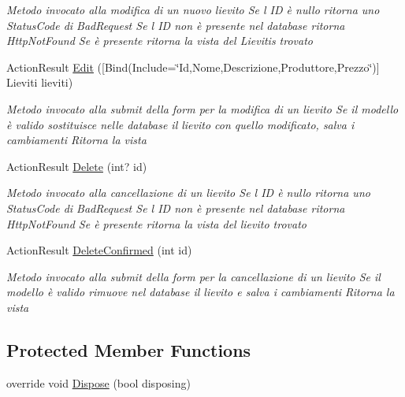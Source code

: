 \begin{DoxyCompactItemize}
\begin{DoxyCompactList}\small\item\em Metodo invocato alla modifica di un nuovo lievito Se l\textquotesingle{} ID è nullo ritorna uno Status\+Code di Bad\+Request Se l\textquotesingle{} ID non è presente nel database ritorna Http\+Not\+Found Se è presente ritorna la vista del Lievitis trovato \end{DoxyCompactList}\item 
Action\+Result \mbox{\hyperlink{class_brew_day2_1_1_controllers_1_1_lievitis_controller_a6be4c8d40b258ae3adc9d1f2c4e74f5e}{Edit}} (\mbox{[}Bind(Include=\char`\"{}Id,Nome,Descrizione,Produttore,Prezzo\char`\"{})\mbox{]} Lieviti lieviti)
\begin{DoxyCompactList}\small\item\em Metodo invocato alla submit della form per la modifica di un lievito Se il modello è valido sostituisce nelle database il lievito con quello modificato, salva i cambiamenti Ritorna la vista \end{DoxyCompactList}\item 
Action\+Result \mbox{\hyperlink{class_brew_day2_1_1_controllers_1_1_lievitis_controller_aeba252744eb8b94117f757f786418295}{Delete}} (int? id)
\begin{DoxyCompactList}\small\item\em Metodo invocato alla cancellazione di un lievito Se l\textquotesingle{} ID è nullo ritorna uno Status\+Code di Bad\+Request Se l\textquotesingle{} ID non è presente nel database ritorna Http\+Not\+Found Se è presente ritorna la vista del lievito trovato \end{DoxyCompactList}\item 
Action\+Result \mbox{\hyperlink{class_brew_day2_1_1_controllers_1_1_lievitis_controller_aaf3d7c0184c52dd5e7884c70867d59c0}{Delete\+Confirmed}} (int id)
\begin{DoxyCompactList}\small\item\em Metodo invocato alla submit della form per la cancellazione di un lievito Se il modello è valido rimuove nel database il lievito e salva i cambiamenti Ritorna la vista \end{DoxyCompactList}\end{DoxyCompactItemize}
\subsection*{Protected Member Functions}
\begin{DoxyCompactItemize}
\item 
override void \mbox{\hyperlink{class_brew_day2_1_1_controllers_1_1_lievitis_controller_aa9b524cd8e58d054551f86244c5fd0a1}{Dispose}} (bool disposing)
\end{DoxyCompactItemize}


